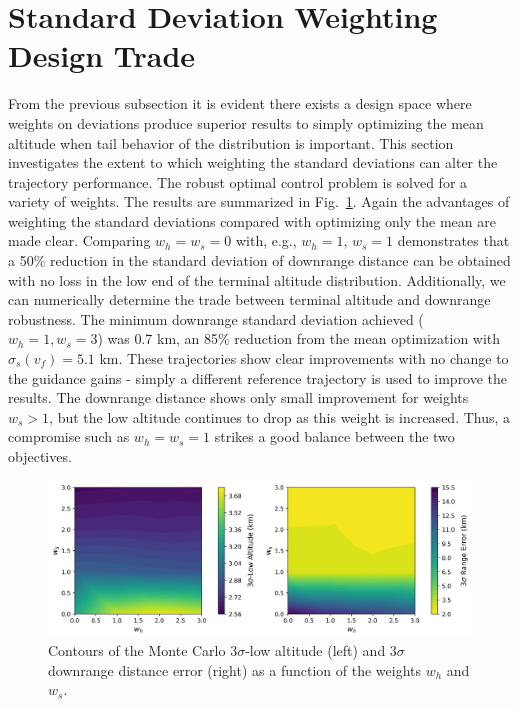\section{Standard Deviation Weighting Design Trade}
From the previous subsection it is evident there exists a design space where weights on deviations produce superior results to simply optimizing the mean altitude when tail behavior of the distribution is important. This section investigates the extent to which weighting the standard deviations can alter the trajectory performance. The robust optimal control problem is solved for a variety of weights. The results are summarized in Fig.~\ref{fig_weight_sweep}. Again the advantages of weighting the standard deviations compared with optimizing only the mean are made clear. Comparing $w_h=w_s=0$ with, e.g., $w_h=1,\,w_s = 1$ demonstrates that a 50\% reduction in the standard deviation of downrange distance can be obtained with no loss in the low end of the terminal altitude distribution. Additionally, we can numerically determine the trade between terminal altitude and downrange robustness. The minimum downrange standard deviation achieved ($w_h=1,w_s=3$) was 0.7 km, an 85\% reduction from the mean optimization with $\sigma_s(v_f)=5.1$ km. These trajectories show clear improvements with no change to the guidance gains - simply a different reference trajectory is used to improve the results. The downrange distance shows only small improvement for weights $w_s>1$, but the low altitude continues to drop as this weight is increased. Thus, a compromise such as $w_h=w_s=1$ strikes a good balance between the two objectives. 
\begin{figure}[h!]
	\centering
	\includegraphics[width=1\textwidth]{../PropellantOptimalJournal/ddp/python/Heavy_WeightSweepMCResults}
	\caption{Contours of the Monte Carlo 3$\sigma$-low altitude (left) and 3$\sigma$ downrange distance error (right) as a function of the weights $w_h$ and $w_s$.}
	\label{fig_weight_sweep}
\end{figure}

